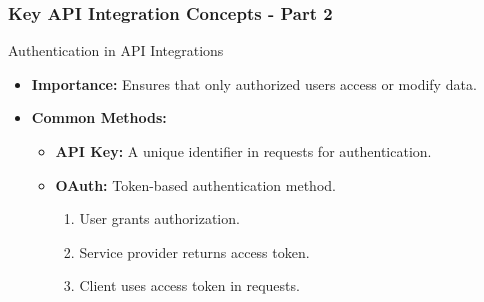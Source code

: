 \documentclass[aspectratio=169]{beamer}
\begin{document}
\begin{frame}[fragile]
  \frametitle{Key API Integration Concepts - Part 2}
  \begin{block}{Authentication in API Integrations}
    \begin{itemize}
      \item \textbf{Importance:} Ensures that only authorized users access or modify data.
      \item \textbf{Common Methods:}
        \begin{itemize}
          \item \textbf{API Key:} A unique identifier in requests for authentication.
          \item \textbf{OAuth:} Token-based authentication method.
            \begin{enumerate}
              \item User grants authorization.
              \item Service provider returns access token.
              \item Client uses access token in requests.
            \end{enumerate}
        \end{itemize}
    \end{itemize}
  \end{block}
\end{frame}
\end{document}
